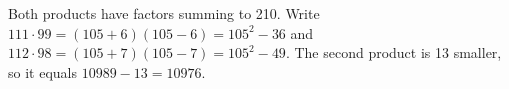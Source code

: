 Both products have factors summing to 210. Write $111\cdot99=(105+6)(105-6)=105^2-36$ and $112\cdot98=(105+7)(105-7)=105^2-49$. The second product is 13 smaller, so it equals $10989-13=\boxed{10976}$.
